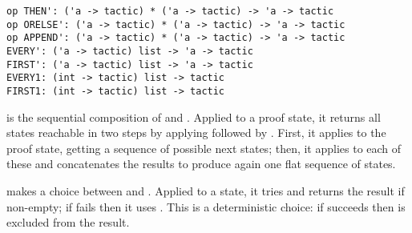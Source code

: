 \begin{isabellebody}
\begin{isamarkuptext}
\begin{mldecls}
  \verb|op THEN': ('a -> tactic) * ('a -> tactic) -> 'a -> tactic| \\
  \verb|op ORELSE': ('a -> tactic) * ('a -> tactic) -> 'a -> tactic| \\
  \verb|op APPEND': ('a -> tactic) * ('a -> tactic) -> 'a -> tactic| \\
  \verb|EVERY': ('a -> tactic) list -> 'a -> tactic| \\
  \verb|FIRST': ('a -> tactic) list -> 'a -> tactic| \\
  \verb|EVERY1: (int -> tactic) list -> tactic| \\
  \verb|FIRST1: (int -> tactic) list -> tactic| \\[0.5ex]
  \end{mldecls}

  \begin{description}

  \item {} is the sequential composition of
   and .  Applied to a proof state, it
  returns all states reachable in two steps by applying 
  followed by .  First, it applies  to the
  proof state, getting a sequence of possible next states; then, it
  applies  to each of these and concatenates the results
  to produce again one flat sequence of states.

  \item {} makes a choice between  and .  Applied to a state, it tries  and returns the result if non-empty; if  fails
  then it uses .  This is a deterministic choice: if
   succeeds then  is excluded from the
  result.


\end{description}
\end{isamarkuptext}
\end{isabellebody}
